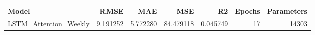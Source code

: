 \begin{tabular}{lrrrrrr}
\toprule
Model & RMSE & MAE & MSE & R2 & Epochs & Parameters \\
\midrule
LSTM_Attention_Weekly & 9.191252 & 5.772280 & 84.479118 & 0.045749 & 17 & 14303 \\
\bottomrule
\end{tabular}
